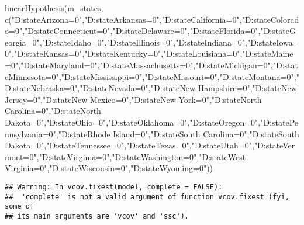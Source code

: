 \documentclass[
]{article}
\newenvironment{Shaded}{\begin{snugshade}}{\end{snugshade}}
\newcommand{\FunctionTok}[1]{\textcolor[rgb]{0.00,0.00,0.00}{#1}}
\newcommand{\NormalTok}[1]{#1}
\newcommand{\StringTok}[1]{\textcolor[rgb]{0.31,0.60,0.02}{#1}}
\begin{document}
\begin{Shaded}
\begin{Highlighting}[]
\FunctionTok{linearHypothesis}\NormalTok{(m\_states, }\FunctionTok{c}\NormalTok{(}\StringTok{"D:stateArizona=0"}\NormalTok{,}\StringTok{"D:stateArkansas=0"}\NormalTok{,}\StringTok{"D:stateCalifornia=0"}\NormalTok{,}\StringTok{"D:stateColorado=0"}\NormalTok{,}\StringTok{"D:stateConnecticut=0"}\NormalTok{,}\StringTok{"D:stateDelaware=0"}\NormalTok{,}\StringTok{"D:stateFlorida=0"}\NormalTok{,}\StringTok{"D:stateGeorgia=0"}\NormalTok{,}\StringTok{"D:stateIdaho=0"}\NormalTok{,}\StringTok{"D:stateIllinois=0"}\NormalTok{,}\StringTok{"D:stateIndiana=0"}\NormalTok{,}\StringTok{"D:stateIowa=0"}\NormalTok{,}\StringTok{"D:stateKansas=0"}\NormalTok{,}\StringTok{"D:stateKentucky=0"}\NormalTok{,}\StringTok{"D:stateLouisiana=0"}\NormalTok{,}\StringTok{"D:stateMaine=0"}\NormalTok{,}\StringTok{"D:stateMaryland=0"}\NormalTok{,}\StringTok{"D:stateMassachusetts=0"}\NormalTok{,}\StringTok{"D:stateMichigan=0"}\NormalTok{,}\StringTok{"D:stateMinnesota=0"}\NormalTok{,}\StringTok{"D:stateMississippi=0"}\NormalTok{,}\StringTok{"D:stateMissouri=0"}\NormalTok{,}\StringTok{"D:stateMontana=0"}\NormalTok{,}\StringTok{"D:stateNebraska=0"}\NormalTok{,}\StringTok{"D:stateNevada=0"}\NormalTok{,}\StringTok{"D:stateNew Hampshire=0"}\NormalTok{,}\StringTok{"D:stateNew Jersey=0"}\NormalTok{,}\StringTok{"D:stateNew Mexico=0"}\NormalTok{,}\StringTok{"D:stateNew York=0"}\NormalTok{,}\StringTok{"D:stateNorth Carolina=0"}\NormalTok{,}\StringTok{"D:stateNorth Dakota=0"}\NormalTok{,}\StringTok{"D:stateOhio=0"}\NormalTok{,}\StringTok{"D:stateOklahoma=0"}\NormalTok{,}\StringTok{"D:stateOregon=0"}\NormalTok{,}\StringTok{"D:statePennsylvania=0"}\NormalTok{,}\StringTok{"D:stateRhode Island=0"}\NormalTok{,}\StringTok{"D:stateSouth Carolina=0"}\NormalTok{,}\StringTok{"D:stateSouth Dakota=0"}\NormalTok{,}\StringTok{"D:stateTennessee=0"}\NormalTok{,}\StringTok{"D:stateTexas=0"}\NormalTok{,}\StringTok{"D:stateUtah=0"}\NormalTok{,}\StringTok{"D:stateVermont=0"}\NormalTok{,}\StringTok{"D:stateVirginia=0"}\NormalTok{,}\StringTok{"D:stateWashington=0"}\NormalTok{,}\StringTok{"D:stateWest Virginia=0"}\NormalTok{,}\StringTok{"D:stateWisconsin=0"}\NormalTok{,}\StringTok{"D:stateWyoming=0"}\NormalTok{))}
\end{Highlighting}
\end{Shaded}

\begin{verbatim}
## Warning: In vcov.fixest(model, complete = FALSE):
##  'complete' is not a valid argument of function vcov.fixest (fyi, some of
## its main arguments are 'vcov' and 'ssc').
\end{verbatim}
\end{document}
